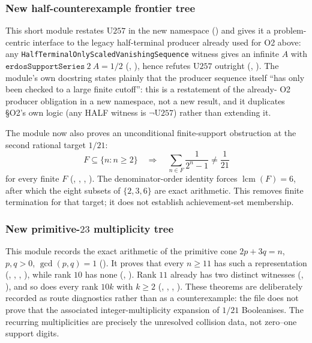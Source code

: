 \subsubsection{New half-counterexample frontier tree}

This short module restates $\mathrm{U257}$ in the new namespace
() and gives it a
problem-centric interface to the legacy half-terminal producer already used for O2 above: any
\texttt{HalfTerminalOnlyScaledVanishingSequence} witness gives an infinite $A$ with
$\mathtt{erdosSupportSeries}\ 2\ A=1/2$
(,
), hence refutes $\mathrm{U257}$ outright
(, ). The
module's own docstring states plainly that the producer sequence itself ``has only been checked to a
large finite cutoff'': this is a restatement of the already- O2 producer obligation in a new
namespace, not a new result, and it duplicates \S O2's own logic (any HALF witness is $\neg\mathrm{U257}$)
rather than extending it.

The module now also proves an unconditional finite-support obstruction at
the second rational target $1/21$:
\[
  F\subseteq\{n:n\ge2\}\quad\Longrightarrow\quad
  \sum_{n\in F}\frac1{2^n-1}\ne\frac1{21}
\]
for every finite $F$
(, ,
, ).  The denominator-order identity forces
$\operatorname{lcm}(F)=6$, after which the eight subsets of $\{2,3,6\}$ are exact arithmetic.
This removes finite termination for that target; it does not establish achievement-set membership.

\subsubsection{New primitive-$23$ multiplicity tree}

This module records the exact arithmetic of the primitive cone
$2p+3q=n$, $p,q>0$, $\gcd(p,q)=1$
().  It proves that every $n\ge11$
has such a representation
(,
, , ), while rank $10$ has none
(, ).
Rank $11$ already has two distinct witnesses
(, ),
and so does every rank $10k$ with $k\ge2$
(,
, , ).  These theorems are deliberately recorded as
route diagnostics rather than as a counterexample: the file does not prove that the associated
integer-multiplicity expansion of $1/21$ Booleanises.  The recurring multiplicities are precisely
the unresolved collision data, not zero--one support digits.

